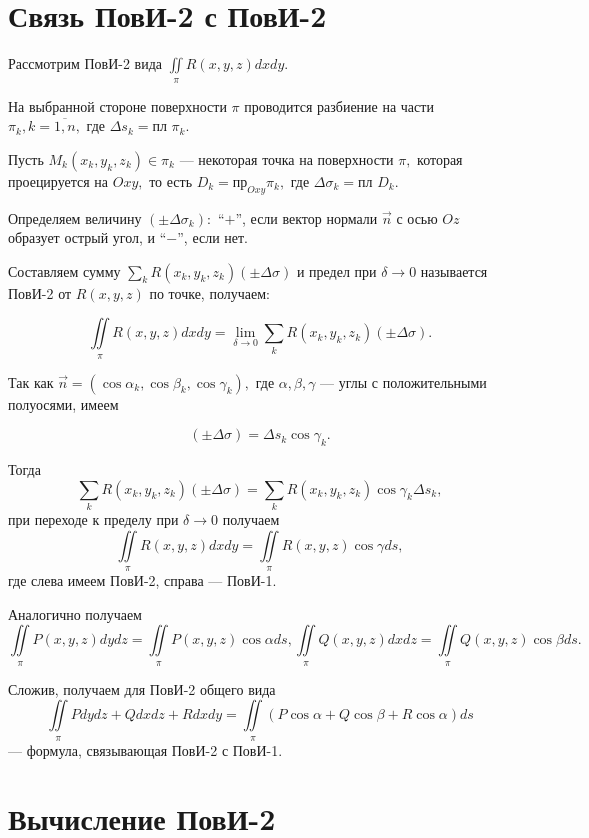 \documentclass[../../main.tex]{subfiles}
\begin{document}
\section{Связь ПовИ-2 с ПовИ-2}

Рассмотрим ПовИ-2 вида $\iint\limits_\pi R(x, y, z)dxdy.$

На выбранной стороне поверхности $\pi$ проводится разбиение на части $\pi_k, k=\overline{1,n},$ где $\Delta s_k =\text{пл }\pi_k.$

Пусть $M_k(x_k, y_k, z_k)\in\pi_k$ --- некоторая точка на поверхности $\pi,$ которая проецируется на $Oxy,$ то есть $D_k = \text{пр}_{Oxy} \pi_k,$ где $\Delta\sigma_k = \text{пл }D_k.$

Определяем величину $(\pm\Delta\sigma_k):$ \textquotedblleft $+$\textquotedblright, если вектор нормали $\vec{n}$ с осью $Oz$ образует острый угол, и \textquotedblleft $-$\textquotedblright, если нет.

Составляем сумму $\sum\limits_k R(x_k, y_k, z_k)(\pm\Delta\sigma)$ и предел при $\delta\rightarrow 0$ называется ПовИ-2 от $R(x, y, z)$  по точке, получаем:

$$\iint\limits_\pi R(x, y, z)dxdy = \lim_{\delta\rightarrow 0}\sum\limits_k R(x_k, y_k, z_k)(\pm \Delta\sigma).$$

Так как $\vec{n}=(\cos\alpha_k, \cos\beta_k, \cos\gamma_k),$ где $\alpha, \beta, \gamma$ --- углы с положительными полуосями, имеем

$$(\pm\Delta\sigma) = \Delta s_k\cos\gamma_k.$$

Тогда 
$$\sum\limits_k R(x_k, y_k, z_k)(\pm \Delta\sigma) = \sum\limits_k  R(x_k, y_k, z_k) \cos\gamma_k \Delta s_k,$$
при переходе к пределу при $\delta\rightarrow 0$ получаем
$$\iint\limits_\pi R(x, y, z)dxdy = \iint\limits_\pi R(x, y, z) \cos\gamma ds,$$ где слева имеем ПовИ-2, справа --- ПовИ-1.

Аналогично получаем $$\iint\limits_\pi P(x, y, z)dydz = \iint\limits_\pi P(x, y, z) \cos\alpha ds, \iint\limits_\pi Q(x, y, z)dxdz = \iint\limits_\pi Q(x, y, z) \cos\beta ds.$$

Сложив, получаем для ПовИ-2 общего вида
\begin{equation}\label{lec24, num_1}\iint\limits_\pi Pdydz + Qdxdz + Rdxdy = \iint\limits_\pi(P\cos\alpha + Q\cos\beta + R\cos\alpha)ds\end{equation} --- формула, связывающая ПовИ-2 с ПовИ-1.

\section{Вычисление ПовИ-2}
\end{document}
